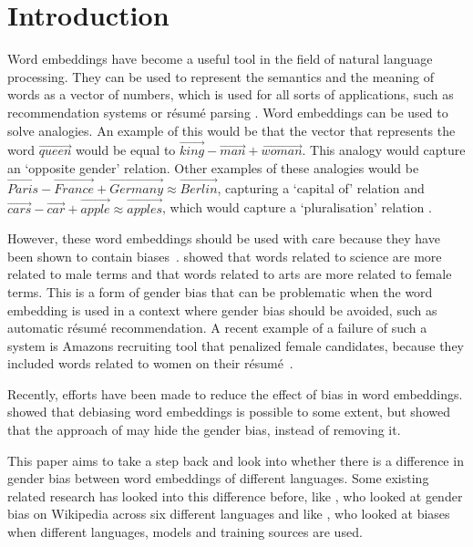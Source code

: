 \section{Introduction}
Word embeddings have become a useful tool in the field of natural language
processing. They can be used to represent the semantics and the meaning of
words as a vector of numbers, which is used for all sorts of applications, such as
recommendation systems \parencite{10.1145/3219819.3219885} or résumé
parsing \parencite{large-scale-hoang-2017, nasser2018convolutional}. Word
embeddings can be used to solve analogies. An example of this would be that the
vector that represents the word
$\overrightarrow{queen}$ would be equal to $\overrightarrow{king} -
\overrightarrow{man} +
\overrightarrow{woman}$. This analogy would capture an `opposite gender' relation.
Other examples of these analogies would be $\overrightarrow{Paris} -
\overrightarrow{France} + \overrightarrow{Germany} \approx \overrightarrow{Berlin}$,
capturing a `capital of' relation and
$\overrightarrow{cars} - \overrightarrow{car} + \overrightarrow{apple} \approx
\overrightarrow{apples}$, which would capture a `pluralisation' relation \parencite{vylomova-etal-2016-take}.

However, these word embeddings should be used with care because they have been
shown to contain biases~\parencite{caliskan_2017_semantics_language_corpora}.
\textcite{caliskan_2017_semantics_language_corpora} showed
that words related to science are more related to male terms and that
words related to arts are more related to female terms. This is a form of gender bias
that can be problematic when the word embedding is used in a context where gender bias
should be avoided, such as automatic résumé recommendation. A recent example of a failure
of such a system is Amazons recruiting tool that penalized female candidates, because they
included words related to women on their résumé~\parencite{dastin_2018}.

Recently, efforts have been made to reduce the effect of bias in word embeddings.
\textcite{bolukbasi_2016_quantifying_stereotypes} showed that debiasing word embeddings
is possible to some extent, but \textcite{gonen-goldberg-2019-lipstick-pig} showed that
the approach of \textcite{bolukbasi_2016_quantifying_stereotypes} may hide the
gender bias, instead of removing it.

This paper aims to take a step back and look into whether there is a difference in gender
bias between word embeddings of different languages. Some existing related research has
looked into this difference before, like \textcite{2015arXiv150106307W}, who looked at
gender bias on Wikipedia across six different languages and like \textcite{lauscher-glavas-2019-consistently}, who looked at biases when different languages, models and training
sources are used.

